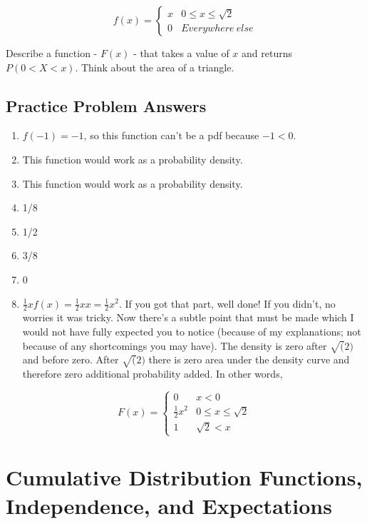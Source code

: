 \documentclass[
]{book}
\providecommand{\tightlist}{%
  \setlength{\itemsep}{0pt}\setlength{\parskip}{0pt}}
\theoremstyle{definition}
\theoremstyle{definition}
\theoremstyle{definition}
\theoremstyle{definition}
\theoremstyle{remark}
\begin{document}
\[
f(x) = 
\begin{cases}
x & 0 \leq x \leq \sqrt{2} \\
0 & Everywhere \: else
\end{cases}
\]

Describe a function - \(F(x)\) - that takes a value of \(x\) and returns \(P(0 < X < x)\). Think about the area of a triangle.

\subsection{Practice Problem Answers}\label{practice-problem-answers-1}

\begin{enumerate}
\def\labelenumi{\arabic{enumi}.}
\tightlist
\item
  \(f(-1) = -1\), so this function can't be a pdf because \(-1 < 0\).
\item
  This function would work as a probability density.
\item
  This function would work as a probability density.
\item
  1/8
\item
  1/2
\item
  3/8
\item
  0
\item
  \(\frac{1}{2}xf(x) = \frac{1}{2}xx = \frac{1}{2}x^2\). If you got that part, well done! If you didn't, no worries it was tricky. Now there's a subtle point that must be made which I would not have fully expected you to notice (because of my explanations; not because of any shortcomings you may have). The density is zero after \(\sqrt(2)\) and before zero. After \(\sqrt(2)\) there is zero area under the density curve and therefore zero additional probability added. In other words,
\end{enumerate}

\[
F(x) = 
\begin{cases}
0 & x < 0 \\
\frac{1}{2}x^2 & 0 \leq x \leq \sqrt{2} \\
1 & \sqrt{2} < x
\end{cases}
\]

\section{Cumulative Distribution Functions, Independence, and Expectations}\label{cumulative-distribution-functions-independence-and-expectations}
\end{document}
